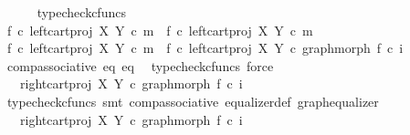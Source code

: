 \begin{isabellebody}
\ \ \ \ \isamarkupfalse%
\ typecheck{\isacharunderscore}{\kern0pt}cfuncs\ \ \isanewline
\ \ \isamarkupfalse%
\ {\isachardoublequoteopen}f{}\ {\isasymcirc}\isactrlsub c\ left{\isacharunderscore}{\kern0pt}cart{\isacharunderscore}{\kern0pt}proj\ X\ Y\ {\isasymcirc}\isactrlsub c\ m\ {\isacharequal}{\kern0pt}\ f{}\ {\isasymcirc}\isactrlsub c\ left{\isacharunderscore}{\kern0pt}cart{\isacharunderscore}{\kern0pt}proj\ X\ Y\ {\isasymcirc}\isactrlsub c\ m{\isachardoublequoteclose}\isanewline
\ \ \isamarkupfalse%
\ {\isacharminus}{\kern0pt}\ \isanewline
\ \ \ \ \isamarkupfalse%
\ {\isachardoublequoteopen}f{}\ {\isasymcirc}\isactrlsub c\ left{\isacharunderscore}{\kern0pt}cart{\isacharunderscore}{\kern0pt}proj\ X\ Y\ {\isasymcirc}\isactrlsub c\ m\ {\isacharequal}{\kern0pt}\ {\isacharparenleft}{\kern0pt}f{}\ {\isasymcirc}\isactrlsub c\ left{\isacharunderscore}{\kern0pt}cart{\isacharunderscore}{\kern0pt}proj\ X\ Y{\isacharparenright}{\kern0pt}\ {\isasymcirc}\isactrlsub c\ graph{\isacharunderscore}{\kern0pt}morph\ f{}\ {\isasymcirc}\isactrlsub c\ i{}{\isachardoublequoteclose}\isanewline
\ \ \ \ \ \ \isamarkupfalse%
\ comp{\isacharunderscore}{\kern0pt}associative{}\ eq{}\ eq{}\ \isamarkupfalse%
\ {\isacharparenleft}{\kern0pt}typecheck{\isacharunderscore}{\kern0pt}cfuncs{\isacharcomma}{\kern0pt}\ force{\isacharparenright}{\kern0pt}\isanewline
\ \ \ \ \isamarkupfalse%
\ \isamarkupfalse%
\ {\isachardoublequoteopen}{\isachardot}{\kern0pt}{\isachardot}{\kern0pt}{\isachardot}{\kern0pt}\ {\isacharequal}{\kern0pt}\ {\isacharparenleft}{\kern0pt}right{\isacharunderscore}{\kern0pt}cart{\isacharunderscore}{\kern0pt}proj\ X\ Y{\isacharparenright}{\kern0pt}\ {\isasymcirc}\isactrlsub c\ graph{\isacharunderscore}{\kern0pt}morph\ f{}\ {\isasymcirc}\isactrlsub c\ i{}{\isachardoublequoteclose}\isanewline
\ \ \ \ \ \ \isamarkupfalse%
\ {\isacharparenleft}{\kern0pt}typecheck{\isacharunderscore}{\kern0pt}cfuncs{\isacharcomma}{\kern0pt}\ smt\ comp{\isacharunderscore}{\kern0pt}associative{}\ equalizer{\isacharunderscore}{\kern0pt}def\ graph{\isacharunderscore}{\kern0pt}equalizer{}{\isacharparenright}{\kern0pt}\isanewline
\ \ \ \ \isamarkupfalse%
\ \isamarkupfalse%
\ {\isachardoublequoteopen}{\isachardot}{\kern0pt}{\isachardot}{\kern0pt}{\isachardot}{\kern0pt}\ {\isacharequal}{\kern0pt}\ {\isacharparenleft}{\kern0pt}right{\isacharunderscore}{\kern0pt}cart{\isacharunderscore}{\kern0pt}proj\ X\ Y{\isacharparenright}{\kern0pt}\ {\isasymcirc}\isactrlsub c\ graph{\isacharunderscore}{\kern0pt}morph\ f{}\ {\isasymcirc}\isactrlsub c\ i{}{\isachardoublequoteclose}\isanewline

\end{isabellebody}

